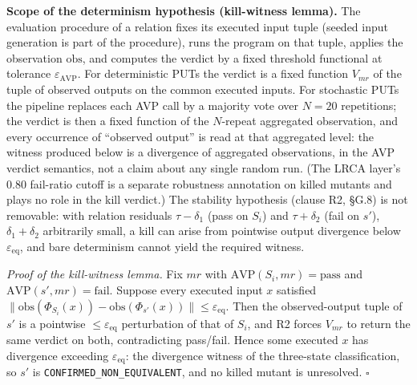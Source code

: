 \documentclass[manuscript,screen,review]{acmart}
\begin{document}
\textbf{Scope of the determinism hypothesis (kill-witness lemma).} The
evaluation procedure of a relation fixes its executed input tuple
(seeded input generation is part of the procedure), runs the program on
that tuple, applies the observation $\mathrm{obs}$, and computes the
verdict by a fixed threshold functional at tolerance
$\varepsilon_{\mathrm{AVP}}$. For deterministic PUTs the verdict is a
fixed function $V_{mr}$ of the tuple of observed outputs on the common
executed inputs. For stochastic PUTs the pipeline replaces each AVP call
by a majority vote over $N = 20$ repetitions; the verdict is then a
fixed function of the $N$-repeat aggregated observation, and every
occurrence of ``observed output'' is read at that aggregated level: the
witness produced below is a divergence of aggregated observations, in
the AVP verdict semantics, not a claim about any single random run.
(The LRCA layer's 0.80 fail-ratio cutoff is a separate robustness
annotation on killed mutants and plays no role in the kill verdict.)
The stability hypothesis (clause R2, §G.8) is not removable: with
relation residuals $\tau - \delta_1$ (pass on $S_i$) and
$\tau + \delta_2$ (fail on $s'$), $\delta_1 + \delta_2$ arbitrarily
small, a kill can arise from pointwise output divergence below
$\varepsilon_{\mathrm{eq}}$, and bare determinism cannot yield the
required witness.

\emph{Proof of the kill-witness lemma.} Fix $mr$ with
$\mathrm{AVP}(S_i, mr) = \mathrm{pass}$ and
$\mathrm{AVP}(s', mr) = \mathrm{fail}$. Suppose every executed input $x$
satisfied
$\|\mathrm{obs}(\Phi_{S_i}(x)) - \mathrm{obs}(\Phi_{s'}(x))\| \leq \varepsilon_{\mathrm{eq}}$.
Then the observed-output tuple of $s'$ is a pointwise
$\leq \varepsilon_{\mathrm{eq}}$ perturbation of that of $S_i$, and R2
forces $V_{mr}$ to return the same verdict on both, contradicting
pass/fail. Hence some executed $x$ has divergence exceeding
$\varepsilon_{\mathrm{eq}}$: the divergence witness of the three-state
classification, so $s'$ is \texttt{CONFIRMED\_NON\_EQUIVALENT}, and no
killed mutant is unresolved. $\square$
\end{document}
